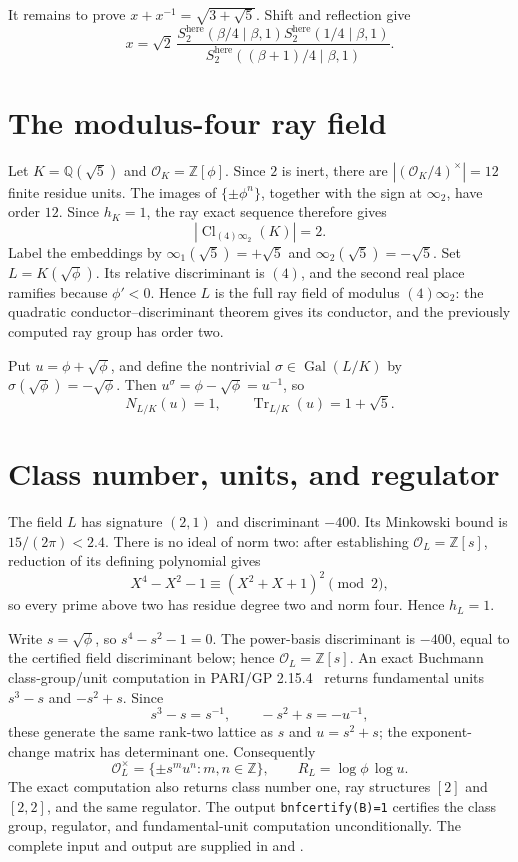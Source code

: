 \documentclass[11pt]{article}
\newcommand{\Tr}{\operatorname{Tr}}
\newcommand{\Q}{\mathbb Q}
\newcommand{\Z}{\mathbb Z}
\begin{document}
It remains to prove $x+x^{-1}=\sqrt{3+\sqrt5}$.  Shift and reflection
give
\[
 x=\sqrt2\,
 \frac{S_2^{\mathrm{here}}(\beta/4\mid\beta,1)
 S_2^{\mathrm{here}}(1/4\mid\beta,1)}
 {S_2^{\mathrm{here}}((\beta+1)/4\mid\beta,1)}.
\]

\section{The modulus-four ray field}

Let $K=\Q(\sqrt5)$ and $\mathcal O_K=\Z[\phi]$.  Since $2$ is inert,
there are $|(\mathcal O_K/4)^\times|=12$ finite residue units.
The images of $\{\pm\phi^n\}$, together with the sign at
$\infty_2$, have order $12$.  Since $h_K=1$, the ray exact sequence
therefore gives
\[
 |\operatorname{Cl}_{(4)\infty_2}(K)|=2.
\]
Label the embeddings by
$\infty_1(\sqrt5)=+\sqrt5$ and
$\infty_2(\sqrt5)=-\sqrt5$.  Set $L=K(\sqrt\phi)$.  Its relative
discriminant is $(4)$, and the second real place ramifies because
$\phi'<0$.  Hence $L$ is the full ray field of modulus
$(4)\infty_2$: the quadratic conductor--discriminant theorem gives its
conductor, and the previously computed ray group has order two.

Put $u=\phi+\sqrt\phi$, and define the nontrivial
$\sigma\in\operatorname{Gal}(L/K)$ by
$\sigma(\sqrt\phi)=-\sqrt\phi$.  Then
$u^\sigma=\phi-\sqrt\phi=u^{-1}$, so
\[
 N_{L/K}(u)=1,\qquad \Tr_{L/K}(u)=1+\sqrt5.
\]

\section{Class number, units, and regulator}

The field $L$ has signature $(2,1)$ and discriminant $-400$.
Its Minkowski bound is $15/(2\pi)<2.4$.  There is no ideal of norm two:
after establishing $\mathcal O_L=\Z[s]$, reduction of its defining
polynomial gives
\[
 X^4-X^2-1\equiv(X^2+X+1)^2\pmod2,
\]
so every prime above two has residue degree two and norm four.  Hence
$h_L=1$.

Write $s=\sqrt\phi$, so $s^4-s^2-1=0$.  The power-basis
discriminant is $-400$, equal to the certified field discriminant
below; hence $\mathcal O_L=\Z[s]$.  An exact Buchmann class-group/unit
computation in PARI/GP 2.15.4~\cite{PARI} returns fundamental units
$s^3-s$ and $-s^2+s$.  Since
\[
 s^3-s=s^{-1},\qquad -s^2+s=-u^{-1},
\]
these generate the same rank-two lattice as $s$ and $u=s^2+s$; the
exponent-change matrix has determinant one.  Consequently
\[
 \mathcal O_L^\times=\{\pm s^m u^n:m,n\in\Z\},\qquad
 R_L=\log\phi\,\log u.
\]
The exact computation also returns class number one, ray structures
$[2]$ and $[2,2]$, and the same regulator.  The output
\texttt{bnfcertify(B)=1} certifies the class group, regulator, and
fundamental-unit computation unconditionally.
The complete input and output are supplied in
 and
.
\end{document}
